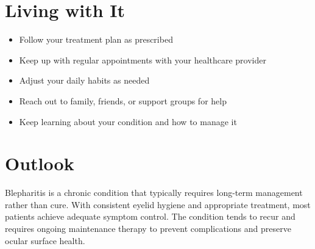 \section{Living with It}

\begin{itemize}[noitemsep]
  \item Follow your treatment plan as prescribed
  \item Keep up with regular appointments with your healthcare provider
  \item Adjust your daily habits as needed
  \item Reach out to family, friends, or support groups for help
  \item Keep learning about your condition and how to manage it
\end{itemize}

\section{Outlook}
Blepharitis is a chronic condition that typically requires long-term management rather than cure. With consistent eyelid hygiene and appropriate treatment, most patients achieve adequate symptom control. The condition tends to recur and requires ongoing maintenance therapy to prevent complications and preserve ocular surface health.
